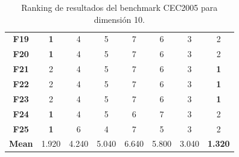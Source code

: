 \begin{table}
\begin{tabular}{cccccccc}
		\textbf{F19}  &      \textbf{1} &      4 &      5 &      7 &      6 &      3 &      2 \\
		\textbf{F20}  &      \textbf{1} &      4 &      5 &      7 &      6 &      3 &      2 \\
		\textbf{F21}  &      2 &      4 &      5 &      7 &      6 &      3 &      \textbf{1} \\
		\textbf{F22}  &      2 &      4 &      5 &      7 &      6 &      3 &      \textbf{1} \\
		\textbf{F23}  &      2 &      4 &      5 &      7 &      6 &      3 &      \textbf{1} \\
		\textbf{F24}  &      \textbf{1} &      4 &      5 &      6 &      7 &      3 &      2 \\
		\textbf{F25}  &      \textbf{1} &      6 &      4 &      7 &      5 &      3 &      2 \\
		\midrule
		\textbf{Mean} &  1.920 &  4.240 &  5.040 &  6.640 &  5.800 &  3.040 &  \textbf{1.320} \\
		\bottomrule
	\end{tabular}
	\caption{Ranking de resultados del benchmark CEC2005 para dimensión 10.}\label{t:ranking-10}
\end{table}

